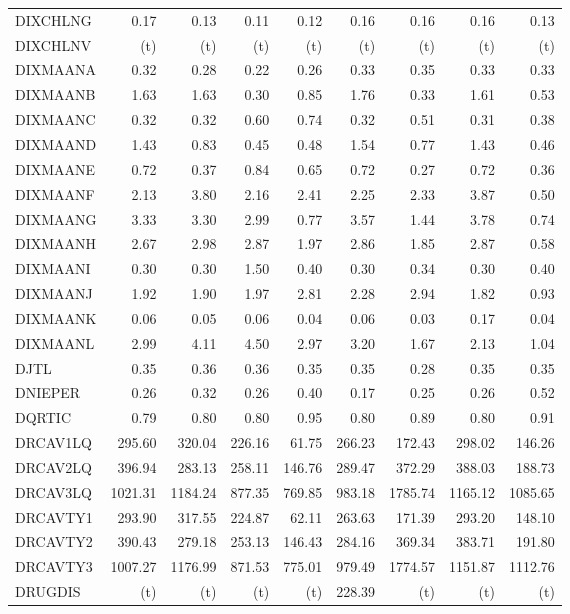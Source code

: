 \documentclass[11pt,twoside]{article}
\begin{document}
{\begin{longtable}[c]{|l|r|r|r|r|r|r|r|r|}
DIXCHLNG & 0.17 & 0.13 & 0.11 & 0.12 & 0.16 & 0.16 & 0.16 & 0.13 \\
DIXCHLNV & (t) & (t) & (t) & (t) & (t) & (t) & (t) & (t) \\
DIXMAANA & 0.32 & 0.28 & 0.22 & 0.26 & 0.33 & 0.35 & 0.33 & 0.33 \\
DIXMAANB & 1.63 & 1.63 & 0.30 & 0.85 & 1.76 & 0.33 & 1.61 & 0.53 \\
DIXMAANC & 0.32 & 0.32 & 0.60 & 0.74 & 0.32 & 0.51 & 0.31 & 0.38 \\
DIXMAAND & 1.43 & 0.83 & 0.45 & 0.48 & 1.54 & 0.77 & 1.43 & 0.46 \\
DIXMAANE & 0.72 & 0.37 & 0.84 & 0.65 & 0.72 & 0.27 & 0.72 & 0.36 \\
DIXMAANF & 2.13 & 3.80 & 2.16 & 2.41 & 2.25 & 2.33 & 3.87 & 0.50 \\
DIXMAANG & 3.33 & 3.30 & 2.99 & 0.77 & 3.57 & 1.44 & 3.78 & 0.74 \\
DIXMAANH & 2.67 & 2.98 & 2.87 & 1.97 & 2.86 & 1.85 & 2.87 & 0.58 \\
DIXMAANI & 0.30 & 0.30 & 1.50 & 0.40 & 0.30 & 0.34 & 0.30 & 0.40 \\
DIXMAANJ & 1.92 & 1.90 & 1.97 & 2.81 & 2.28 & 2.94 & 1.82 & 0.93 \\
DIXMAANK & 0.06 & 0.05 & 0.06 & 0.04 & 0.06 & 0.03 & 0.17 & 0.04 \\
DIXMAANL & 2.99 & 4.11 & 4.50 & 2.97 & 3.20 & 1.67 & 2.13 & 1.04 \\
DJTL & 0.35 & 0.36 & 0.36 & 0.35 & 0.35 & 0.28 & 0.35 & 0.35 \\
DNIEPER & 0.26 & 0.32 & 0.26 & 0.40 & 0.17 & 0.25 & 0.26 & 0.52 \\
DQRTIC & 0.79 & 0.80 & 0.80 & 0.95 & 0.80 & 0.89 & 0.80 & 0.91 \\
DRCAV1LQ & 295.60 & 320.04 & 226.16 & 61.75 & 266.23 & 172.43 & 298.02 & 146.26 \\
DRCAV2LQ & 396.94 & 283.13 & 258.11 & 146.76 & 289.47 & 372.29 & 388.03 & 188.73 \\
DRCAV3LQ & 1021.31 & 1184.24 & 877.35 & 769.85 & 983.18 & 1785.74 & 1165.12 & 1085.65 \\
DRCAVTY1 & 293.90 & 317.55 & 224.87 & 62.11 & 263.63 & 171.39 & 293.20 & 148.10 \\
DRCAVTY2 & 390.43 & 279.18 & 253.13 & 146.43 & 284.16 & 369.34 & 383.71 & 191.80 \\
DRCAVTY3 & 1007.27 & 1176.99 & 871.53 & 775.01 & 979.49 & 1774.57 & 1151.87 & 1112.76 \\
DRUGDIS & (t) & (t) & (t) & (t) & 228.39 & (t) & (t) & (t) \\

\end{longtable}}
\end{document}
